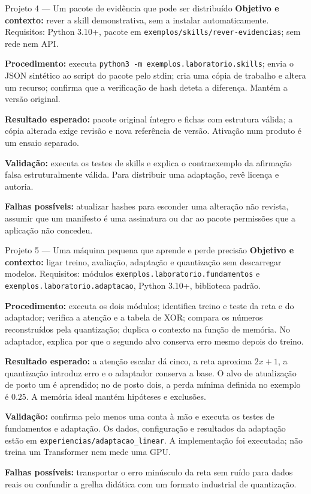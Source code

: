 \begin{promptlabbox}{Projeto 4 — Um pacote de evidência que pode ser distribuído}
\textbf{Objetivo e contexto:} rever a skill demonstrativa, sem a instalar automaticamente. Requisitos: Python 3.10+, pacote em \texttt{exemplos/skills/rever-evidencias}; sem rede nem API.

\textbf{Procedimento:} executa \texttt{python3 -m exemplos.laboratorio.skills}; envia o JSON sintético ao script do pacote pelo stdin; cria uma cópia de trabalho e altera um recurso; confirma que a verificação de hash deteta a diferença. Mantém a versão original.

\textbf{Resultado esperado:} pacote original íntegro e fichas com estrutura válida; a cópia alterada exige revisão e nova referência de versão. Ativação num produto é um ensaio separado.

\textbf{Validação:} executa os testes de skills e explica o contraexemplo da afirmação falsa estruturalmente válida. Para distribuir uma adaptação, revê licença e autoria.

\textbf{Falhas possíveis:} atualizar hashes para esconder uma alteração não revista, assumir que um manifesto é uma assinatura ou dar ao pacote permissões que a aplicação não concedeu.
\end{promptlabbox}

\begin{promptlabbox}{Projeto 5 — Uma máquina pequena que aprende e perde precisão}
\textbf{Objetivo e contexto:} ligar treino, avaliação, adaptação e quantização sem descarregar modelos. Requisitos: módulos \texttt{exemplos.laboratorio.fundamentos} e \texttt{exemplos.laboratorio.adaptacao}, Python 3.10+, biblioteca padrão.

\textbf{Procedimento:} executa os dois módulos; identifica treino e teste da reta e do adaptador; verifica a atenção e a tabela de XOR; compara os números reconstruídos pela quantização; duplica o contexto na função de memória. No adaptador, explica por que o segundo alvo conserva erro mesmo depois do treino.

\textbf{Resultado esperado:} a atenção escalar dá cinco, a reta aproxima $2x+1$, a quantização introduz erro e o adaptador conserva a base. O alvo de atualização de posto um é aprendido; no de posto dois, a perda mínima definida no exemplo é $0.25$. A memória ideal mantém hipóteses e exclusões.

\textbf{Validação:} confirma pelo menos uma conta à mão e executa os testes de fundamentos e adaptação. Os dados, configuração e resultados da adaptação estão em \nolinkurl{experiencias/adaptacao_linear}. A implementação foi executada; não treina um Transformer nem mede uma GPU.

\textbf{Falhas possíveis:} transportar o erro minúsculo da reta sem ruído para dados reais ou confundir a grelha didática com um formato industrial de quantização.
\end{promptlabbox}

